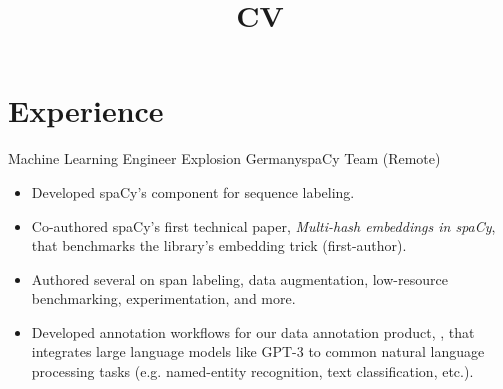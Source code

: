 \documentclass[12pt,a4paper]{moderncv}
\title{CV}
\begin{document}
\maketitle


\section{Experience}

{Machine Learning Engineer}
{Explosion}
{Germany}{spaCy Team (Remote)}
{
    \begin{itemize}
        \item Developed spaCy's {\color{blue}} component for sequence
        labeling.
        \item Co-authored spaCy's first technical paper, \textit{Multi-hash
        embeddings in spaCy}, that benchmarks the library's embedding trick
        (first-author).
        \item Authored several {\color{blue}} on span labeling,
        data augmentation, low-resource benchmarking, experimentation, and more.
        \item Developed annotation workflows for our data annotation product,
        {\color{blue}}, that integrates
        large language models like GPT-3 to common natural language processing
        tasks (e.g. named-entity recognition, text classification, etc.). 
    \end{itemize}
}
\end{document}
